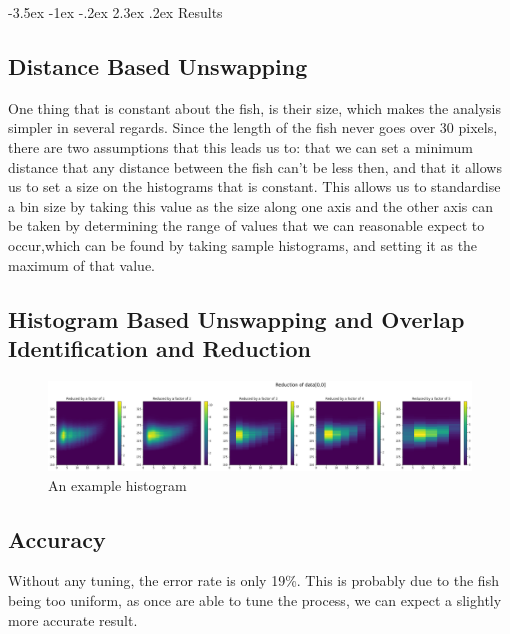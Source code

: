 \documentclass{article}
\makeatletter
\renewcommand\section{\clearpage\newpage\@startsection {section}{1}{\z@}%
	{-3.5ex \@plus -1ex \@minus -.2ex}%
	{2.3ex \@plus.2ex}%
	{\normalfont\Large\bfseries}}
\makeatother
\begin{document}
\section{Results}

\subsection{Distance Based Unswapping}

One thing that is constant about the fish, is their size, which makes the analysis simpler in several regards. Since the length of the fish never goes over 30 pixels, there are two assumptions that this leads us to: that we can set a minimum distance that any distance between the fish can't be less then, and that it allows us to set a size on the histograms that is constant. This allows us to standardise a bin size by taking this value as the size along one axis and the other axis can be taken by determining the range of values that we can reasonable expect to occur,which can be found by taking sample histograms, and setting it as the maximum of that value.

\subsection{Histogram Based Unswapping and Overlap Identification and Reduction}

\begin{figure}[H]
	\centering
	\includegraphics[width=\linewidth]{reducedHist}
	\caption{An example histogram}
	\label{fig:reducedHist}
\end{figure}

\subsection{Accuracy}

Without any tuning, the error rate is only 19\%. This is probably due to the fish being too uniform, as once are able to tune the process, we can expect a slightly more accurate result.
\end{document}

